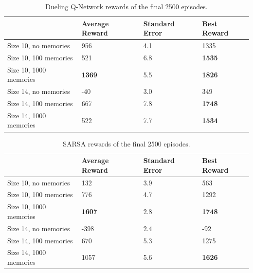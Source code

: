 \begin{table}[H]
\begin{tabular}{l|l|l|l|}
\cline{2-4}
\textbf{} & Average Reward & Standard Error & Best Reward \\ \hline
\multicolumn{1}{|l|}{Size 10, no memories} & 956 & 4.1 & 1335 \\ \hline
\multicolumn{1}{|l|}{Size 10, 100 memories} & 521 & 6.8 & \textbf{1535} \\ \hline
\multicolumn{1}{|l|}{Size 10, 1000 memories} & \textbf{1369} & 5.5 & \textbf{1826} \\ \hline
\multicolumn{1}{|l|}{Size 14, no memories} & -40 & 3.0 & 349 \\ \hline
\multicolumn{1}{|l|}{Size 14, 100 memories} & 667 & 7.8 & \textbf{1748} \\ \hline
\multicolumn{1}{|l|}{Size 14, 1000 memories} & 522 & 7.7 & \textbf{1534} \\ \hline
\end{tabular}
\caption{Dueling Q-Network rewards of the final 2500 episodes.}
\label{tab:2500duel}
\end{table}
\begin{table}[H]
\begin{tabular}{l|l|l|l|}
\cline{2-4}
\textbf{} & Average Reward & Standard Error & Best Reward \\ \hline
\multicolumn{1}{|l|}{Size 10, no memories} & 132 & 3.9 & 563 \\ \hline
\multicolumn{1}{|l|}{Size 10, 100 memories} & 776 & 4.7 & 1292 \\ \hline
\multicolumn{1}{|l|}{Size 10, 1000 memories} & \textbf{1607} & 2.8 & \textbf{1748} \\ \hline
\multicolumn{1}{|l|}{Size 14, no memories} & -398 & 2.4 & -92 \\ \hline
\multicolumn{1}{|l|}{Size 14, 100 memories} & 670 & 5.3 & 1275 \\ \hline
\multicolumn{1}{|l|}{Size 14, 1000 memories} & 1057 & 5.6 & \textbf{1626} \\ \hline
\end{tabular}
\caption{SARSA rewards of the final 2500 episodes.}
\label{tab:2500sarsa}
\end{table}
\clearpage
